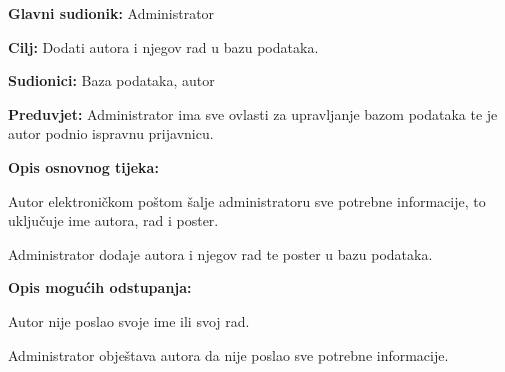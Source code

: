 					\noindent {}
					\begin{packed_item}
						
						\item \textbf{Glavni sudionik: }Administrator
						\item  \textbf{Cilj:} Dodati autora i njegov rad u bazu podataka.
						\item  \textbf{Sudionici:} Baza podataka, autor
						\item  \textbf{Preduvjet:} Administrator ima sve ovlasti za upravljanje bazom podataka te je autor podnio ispravnu prijavnicu.
						\item  \textbf{Opis osnovnog tijeka:}
						
						\item[] \begin{packed_enum}
							
							\item Autor elektroničkom poštom šalje administratoru sve potrebne informacije, to uključuje ime autora, rad i poster.
							\item Administrator dodaje autora i njegov rad te poster u bazu podataka.
					
						\end{packed_enum}
						
						\item  \textbf{Opis mogućih odstupanja:}
						
						\item[] \begin{packed_item}
							
							\item[1.a] Autor nije poslao svoje ime ili svoj rad.
							\item[] \begin{packed_enum}
								
								\item Administrator obještava autora da nije poslao sve potrebne informacije.
								
							\end{packed_enum}
							
						\end{packed_item}
					\end{packed_item}
					

